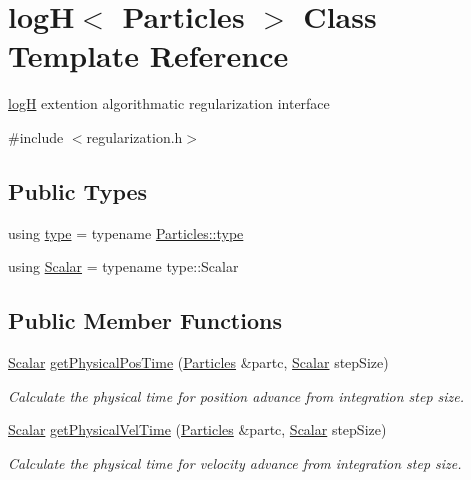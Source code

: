 \hypertarget{classlog_h}{}\section{logH$<$ Particles $>$ Class Template Reference}
\label{classlog_h}


\mbox{\hyperlink{classlog_h}{logH}} extention algorithmatic regularization interface  




{\ttfamily \#include $<$regularization.\+h$>$}

\subsection*{Public Types}
\begin{DoxyCompactItemize}
\item 
using \mbox{\hyperlink{classlog_h_aa902eaf1133d9ef2cd15713d81619240}{type}} = typename \mbox{\hyperlink{class_vel_indep_particles_a0c62b43c2f0a50565e5e06587fddee18}{Particles\+::type}}
\item 
using \mbox{\hyperlink{classlog_h_a2235c75eff5d2e299c8ce4b2c02f8801}{Scalar}} = typename type\+::\+Scalar
\end{DoxyCompactItemize}
\subsection*{Public Member Functions}
\begin{DoxyCompactItemize}
\item 
\mbox{\hyperlink{classlog_h_a2235c75eff5d2e299c8ce4b2c02f8801}{Scalar}} \mbox{\hyperlink{classlog_h_a000fc113a586407aa8dd8fbac34b614a}{get\+Physical\+Pos\+Time}} (\mbox{\hyperlink{struct_particles}{Particles}} \&partc, \mbox{\hyperlink{classlog_h_a2235c75eff5d2e299c8ce4b2c02f8801}{Scalar}} step\+Size)
\begin{DoxyCompactList}\small\item\em Calculate the physical time for position advance from integration step size. \end{DoxyCompactList}\item 
\mbox{\hyperlink{classlog_h_a2235c75eff5d2e299c8ce4b2c02f8801}{Scalar}} \mbox{\hyperlink{classlog_h_a36f5b226fde188b50bf9df1451c75199}{get\+Physical\+Vel\+Time}} (\mbox{\hyperlink{struct_particles}{Particles}} \&partc, \mbox{\hyperlink{classlog_h_a2235c75eff5d2e299c8ce4b2c02f8801}{Scalar}} step\+Size)
\begin{DoxyCompactList}\small\item\em Calculate the physical time for velocity advance from integration step size. \end{DoxyCompactList}\end{DoxyCompactItemize}


